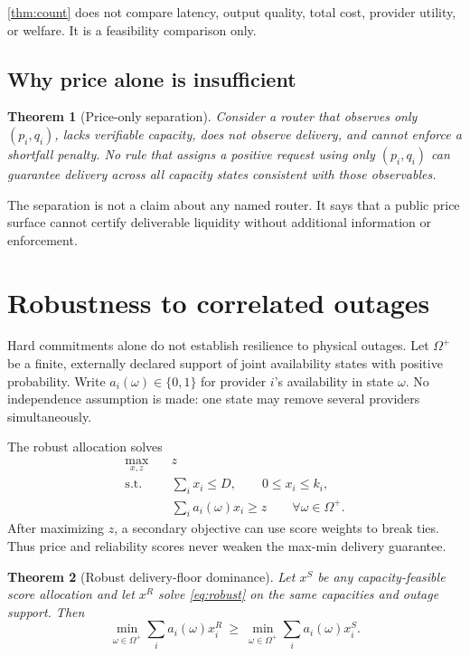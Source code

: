 \documentclass[11pt]{article}
\newtheorem{theorem}{Theorem}
\theoremstyle{definition}
\begin{document}
\cref{thm:count} does not compare latency, output quality, total cost, provider
utility, or welfare. It is a feasibility comparison only.

\subsection{Why price alone is insufficient}

\begin{theorem}[Price-only separation]
\label{thm:separation}
Consider a router that observes only $(p_i,q_i)$, lacks verifiable capacity,
does not observe delivery, and cannot enforce a shortfall penalty. No rule
that assigns a positive request using only $(p_i,q_i)$ can guarantee delivery
across all capacity states consistent with those observables.
\end{theorem}

The separation is not a claim about any named router. It says that a public
price surface cannot certify deliverable liquidity without additional
information or enforcement.

\section{Robustness to correlated outages}
\label{sec:robust}

Hard commitments alone do not establish resilience to physical outages.
Let $\Omega^+$ be a finite, externally declared support of joint availability
states with positive probability. Write $a_i(\omega)\in\{0,1\}$ for provider
$i$'s availability in state $\omega$. No independence assumption is made:
one state may remove several providers simultaneously.

The robust allocation solves
\begin{equation}
\label{eq:robust}
\begin{aligned}
 \max_{x,z}\quad &z\\
 \text{s.t.}\quad
 &\sum_i x_i\leq D,\qquad 0\leq x_i\leq k_i,\\
 &\sum_i a_i(\omega)x_i\geq z\qquad \forall\omega\in\Omega^+.
\end{aligned}
\end{equation}
After maximizing $z$, a secondary objective can use score weights to break
ties. Thus price and reliability scores never weaken the max-min delivery
guarantee.

\begin{theorem}[Robust delivery-floor dominance]
\label{thm:robust}
Let $x^S$ be any capacity-feasible score allocation and let $x^R$ solve
\cref{eq:robust} on the same capacities and outage support. Then
\[
 \min_{\omega\in\Omega^+}\sum_i a_i(\omega)x_i^R
 \ \geq\
 \min_{\omega\in\Omega^+}\sum_i a_i(\omega)x_i^S.
\]
\end{theorem}
\end{document}
